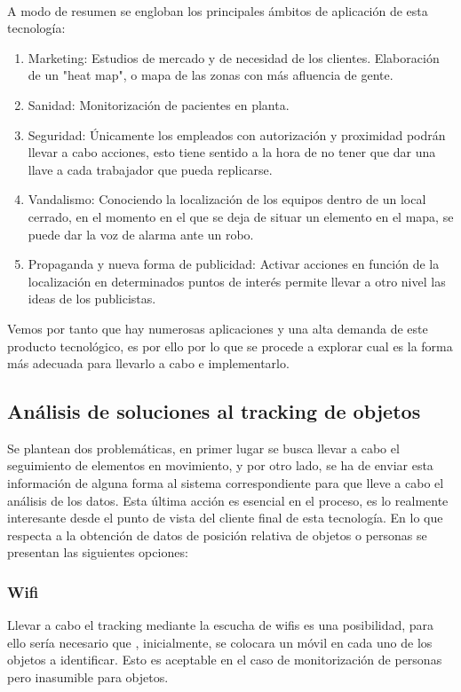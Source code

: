 \documentclass[paper=a4, fontsize=11pt,twoside]{scrartcl}	%
\begin{document}
        \paragraph{}
        A modo de resumen se engloban los principales ámbitos de aplicación de esta tecnología:
        \begin{enumerate}
            \item Marketing: Estudios de mercado y de necesidad de los clientes. Elaboración de un "heat map", o mapa 
            de las zonas con más afluencia de gente.
            \item Sanidad: Monitorización de pacientes en planta. 
            \item Seguridad: Únicamente los empleados con autorización y proximidad podrán llevar a cabo acciones,
            esto tiene sentido a la hora de no tener que dar una llave a cada trabajador que pueda replicarse.
            \item Vandalismo: Conociendo la localización de los equipos dentro de un local cerrado, en el momento 
            en el que se deja de situar un elemento en el mapa, se puede dar la voz de alarma ante un robo.
            \item Propaganda y nueva forma de publicidad: Activar acciones en función de la localización en determinados
            puntos de interés permite llevar a otro nivel las ideas de los publicistas.
        \end{enumerate}
        Vemos por tanto que hay numerosas aplicaciones y una alta demanda de este producto tecnológico, es por ello por lo que se 
        procede a explorar cual es la forma más adecuada para llevarlo a cabo e implementarlo.
    \subsection{Análisis de soluciones al tracking de objetos}
        Se plantean dos problemáticas, en primer lugar se busca llevar a cabo el seguimiento de elementos en movimiento, y por otro lado, 
        se ha de enviar esta información de alguna forma al sistema correspondiente para que lleve a cabo el análisis de los datos. Esta
        última acción es esencial en el proceso, es lo realmente interesante desde el punto de vista del cliente final de esta tecnología.
        En lo que respecta a la obtención de datos de posición relativa de objetos o personas se presentan las siguientes opciones:
        \subsubsection {Wifi}
            Llevar a cabo el tracking mediante la escucha de wifis es una posibilidad, para ello sería
            necesario que , inicialmente, se colocara un móvil en cada uno de los objetos a identificar. Esto es aceptable 
            en el caso de monitorización de personas pero inasumible para objetos.
\end{document}
